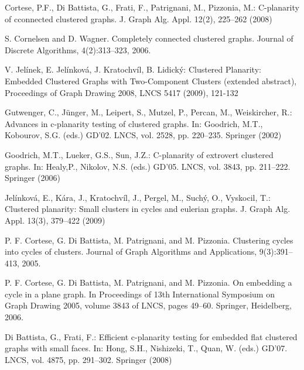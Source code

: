 \documentclass[12pt,a4report]{report}
\theoremstyle{definition}
\begin{document}
\begin{thebibliography}{9}

	Cortese, P.F., Di Battista, G., Frati, F., Patrignani, M., Pizzonia, M.: C-planarity of cconnected clustered graphs. J. Graph Alg. Appl. 12(2), 225–262 (2008)

	S. Cornelsen and D. Wagner. Completely connected clustered graphs. Journal of Discrete Algorithms, 4(2):313–323, 2006.

	V. Jelínek, E. Jelínková, J. Kratochvíl, B. Lidický: Clustered Planarity: Embedded Clustered Graphs with Two-Component Clusters (extended abstract), Proceedings of Graph Drawing 2008, LNCS 5417 (2009), 121-132

	Gutwenger, C., Jünger, M., Leipert, S., Mutzel, P., Percan, M., Weiskircher, R.: Advances in c-planarity testing of clustered graphs. In: Goodrich, M.T., Kobourov, S.G. (eds.) GD’02. LNCS, vol. 2528, pp. 220–235. Springer (2002)

	Goodrich, M.T., Lueker, G.S., Sun, J.Z.: C-planarity of extrovert clustered graphs. In: Healy,P., Nikolov, N.S. (eds.) GD’05. LNCS, vol. 3843, pp. 211–222. Springer (2006)

	Jelínková, E., Kára, J., Kratochvíl, J., Pergel, M., Suchý, O., Vyskocil, T.: Clustered planarity: Small clusters in cycles and eulerian graphs. J. Graph Alg. Appl. 13(3), 379–422 (2009)

P. F. Cortese, G. Di Battista, M. Patrignani, and M. Pizzonia. Clustering cycles into cycles of clusters. Journal of Graph Algorithms and Applications,
9(3):391–413, 2005.

	P. F. Cortese, G. Di Battista, M. Patrignani, and M. Pizzonia. On embedding a cycle in a plane graph. In Proceedings of 13th International Symposium on Graph Drawing 2005, volume 3843 of LNCS, pages 49–60. Springer, Heidelberg, 2006.

	Di Battista, G., Frati, F.: Efficient c-planarity testing for embedded flat clustered graphs with small faces. In: Hong, S.H., Nishizeki, T., Quan, W. (eds.) GD’07. LNCS, vol. 4875, pp. 291–302. Springer (2008)


\end{thebibliography}
\end{document}
